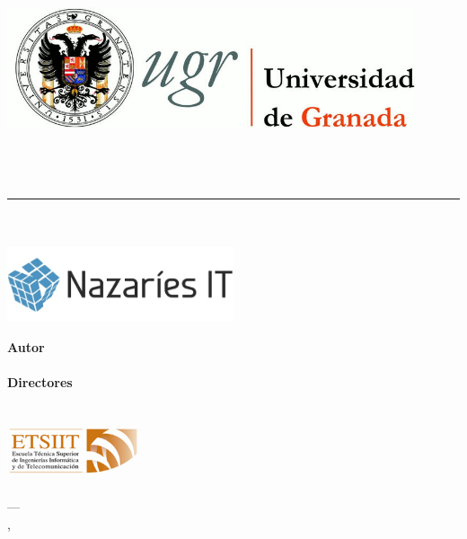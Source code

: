 \begin{titlepage}
 
 
\newlength{\centeroffset}
\setlength{\centeroffset}{-0.5\oddsidemargin}
\addtolength{\centeroffset}{0.5\evensidemargin}
\thispagestyle{empty}

\noindent\hspace*{\centeroffset}

\begin{minipage}{\textwidth}

\centering
\includegraphics[width=0.9\textwidth]{imagenes/logo_ugr.jpg}\\[1.4cm]

\textsc{ \Large \MakeUppercase{\myDocument}\\[0.2cm]}
\textsc{ \MakeUppercase{\myDegree}}\\[1cm]
% 
{\Huge\bfseries \myTitle \\
}
\noindent\rule[-1ex]{\textwidth}{3pt}\\[3.5ex]
{\large\bfseries \myCompany}\\[0.6cm]
\includegraphics[width=0.5\textwidth]{imagenes/nazaries_it.png}\\

\end{minipage}

\vspace{1cm}
\noindent\hspace*{\centeroffset}

\begin{minipage}{\textwidth}
\centering

\textbf{Autor}\\ {\myName}\\[2.5ex]
\textbf{Directores}\\
{\myProf\\
\myOtherProf}\\[1cm]
\includegraphics[width=0.3\textwidth]{imagenes/etsiit_logo.png}\\[0.1cm]
\textsc{\myFacultyShort}\\
\textsc{---}\\
\myLocation, \myTime
\end{minipage}
\end{titlepage}


